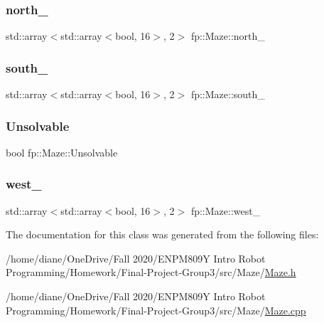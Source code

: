 \subsubsection{\texorpdfstring{north\+\_\+}{north\_}}
{\footnotesize\ttfamily std\+::array$<$std\+::array$<$bool, 16$>$, 2$>$ fp\+::\+Maze\+::north\+\_\+}

\mbox{\label{classfp_1_1_maze_ab494935167a2bf7f358b72e6c032eef8}} 
\subsubsection{\texorpdfstring{south\+\_\+}{south\_}}
{\footnotesize\ttfamily std\+::array$<$std\+::array$<$bool, 16$>$, 2$>$ fp\+::\+Maze\+::south\+\_\+}

\mbox{\label{classfp_1_1_maze_abdf504125bc0cd3ea18ba17b0887a5a2}} 
\subsubsection{\texorpdfstring{Unsolvable}{Unsolvable}}
{\footnotesize\ttfamily bool fp\+::\+Maze\+::\+Unsolvable}

\mbox{\label{classfp_1_1_maze_afc8b97457d6f4ff69ed812741982c298}} 
\subsubsection{\texorpdfstring{west\+\_\+}{west\_}}
{\footnotesize\ttfamily std\+::array$<$std\+::array$<$bool, 16$>$, 2$>$ fp\+::\+Maze\+::west\+\_\+}



The documentation for this class was generated from the following files\+:\begin{DoxyCompactItemize}
\item 
/home/diane/\+One\+Drive/\+Fall 2020/\+E\+N\+P\+M809\+Y Intro Robot Programming/\+Homework/\+Final-\/\+Project-\/\+Group3/src/\+Maze/\hyperlink{_maze_8h}{Maze.\+h}\item 
/home/diane/\+One\+Drive/\+Fall 2020/\+E\+N\+P\+M809\+Y Intro Robot Programming/\+Homework/\+Final-\/\+Project-\/\+Group3/src/\+Maze/\hyperlink{_maze_8cpp}{Maze.\+cpp}\end{DoxyCompactItemize}
